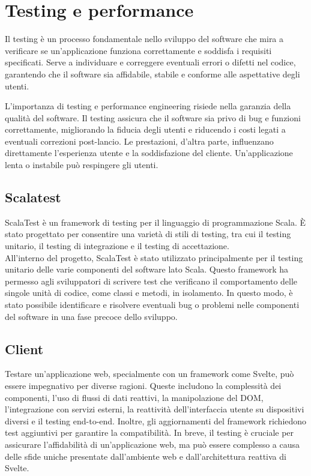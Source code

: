 
\section{Testing e performance}

Il testing è un processo fondamentale nello sviluppo del software che mira a verificare se un'applicazione
funziona correttamente e soddisfa i requisiti specificati. Serve a individuare e correggere eventuali
errori o difetti nel codice, garantendo che il software sia affidabile, stabile e conforme alle aspettative degli utenti.

L'importanza di testing e performance engineering risiede nella garanzia della qualità del software.
Il testing assicura che il software sia privo di bug e funzioni correttamente, migliorando la fiducia
degli utenti e riducendo i costi legati a eventuali correzioni post-lancio. Le prestazioni,
d'altra parte, influenzano direttamente l'esperienza utente e la soddisfazione del cliente.
Un'applicazione lenta o instabile può respingere gli utenti.

\subsection{Scalatest}
ScalaTest è un framework di testing per il linguaggio di programmazione Scala.
È stato progettato per consentire una varietà di stili di testing, tra cui il testing unitario,
il testing di integrazione e il testing di accettazione.\\

All'interno del progetto, ScalaTest è stato utilizzato principalmente per il testing
unitario delle varie componenti del software lato Scala. Questo framework ha permesso agli
sviluppatori di scrivere test che verificano il comportamento delle singole unità di codice,
come classi e metodi, in isolamento. In questo modo, è stato possibile identificare e risolvere
eventuali bug o problemi nelle componenti del software in una fase precoce dello sviluppo.

\subsection{Client}
Testare un'applicazione web, specialmente con un framework come Svelte, può essere
impegnativo per diverse ragioni. Queste includono la complessità dei componenti,
l'uso di flussi di dati reattivi, la manipolazione del DOM, l'integrazione con servizi
esterni, la reattività dell'interfaccia utente su dispositivi diversi e il testing end-to-end.
Inoltre, gli aggiornamenti del framework richiedono test aggiuntivi per garantire la compatibilità.
In breve, il testing è cruciale per assicurare l'affidabilità di un'applicazione web, ma può essere
complesso a causa delle sfide uniche presentate dall'ambiente web e dall'architettura reattiva di Svelte.


